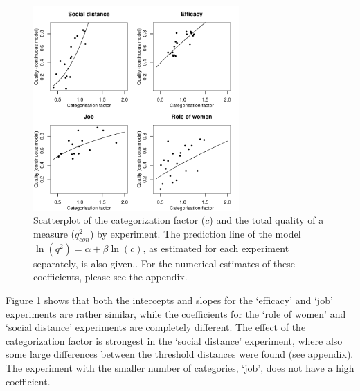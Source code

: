 \documentclass[a4paper,12pt]{article}
\begin{document}
\begin{figure}[bth] \centering \includegraphics[width=0.7\textwidth]{i/predict_q2.pdf} \caption{Scatterplot of the categorization factor ($c$) and the total quality of a measure ($q^2_{con}$) by experiment. The prediction line of the model $\ln(q^2) = \alpha + \beta \ln(c)$, as estimated for each experiment separately, is also given.\label{fig:predict}. For the numerical estimates of these coefficients, please see the appendix.} \end{figure}

Figure \ref{fig:predict} shows that both the intercepts and slopes for the `efficacy' and `job' experiments are rather similar, while the coefficients for the `role of women' and `social distance' experiments are completely different. The effect of the categorization factor is strongest in the `social distance' experiment, where also some large differences between the threshold distances were found (see appendix). The experiment with the smaller number of categories, `job', does not have a high coefficient.

\end{document}
